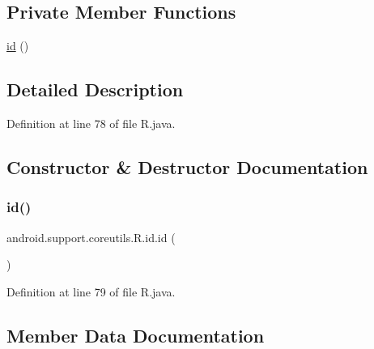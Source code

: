 \subsection*{Private Member Functions}
\begin{DoxyCompactItemize}
\item 
\mbox{\hyperlink{classandroid_1_1support_1_1coreutils_1_1_r_1_1id_a2be50e004939b8a3fbae0585d6969e0b}{id}} ()
\end{DoxyCompactItemize}


\subsection{Detailed Description}


Definition at line 78 of file R.\+java.



\subsection{Constructor \& Destructor Documentation}
\mbox{\label{classandroid_1_1support_1_1coreutils_1_1_r_1_1id_a2be50e004939b8a3fbae0585d6969e0b}} 
\subsubsection{\texorpdfstring{id()}{id()}}
{\footnotesize\ttfamily android.\+support.\+coreutils.\+R.\+id.\+id (\begin{DoxyParamCaption}{ }\end{DoxyParamCaption})\hspace{0.3cm}{\ttfamily [private]}}



Definition at line 79 of file R.\+java.


\begin{DoxyCode}{0}

\end{DoxyCode}


\subsection{Member Data Documentation}
\mbox{\label{classandroid_1_1support_1_1coreutils_1_1_r_1_1id_acef2a9e85463b5b560ea32ce9cd47e6b}} 
